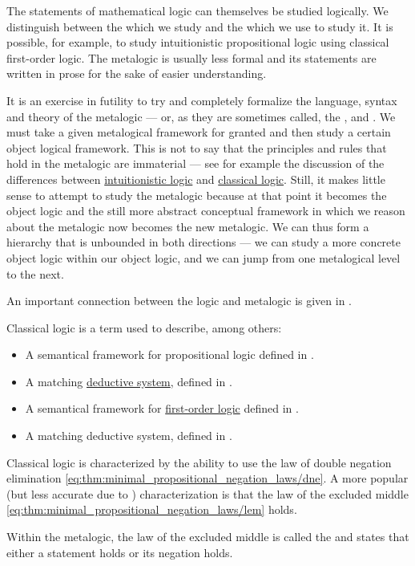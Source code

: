 \begin{remark}\label{rem:metalogic}
  The statements of mathematical logic can themselves be studied logically. We distinguish between the  which we study and the  which we use to study it. It is possible, for example, to study intuitionistic propositional logic using classical first-order logic. The metalogic is usually less formal and its statements are written in prose for the sake of easier understanding.

  It is an exercise in futility to try and completely formalize the language, syntax and theory of the metalogic --- or, as they are sometimes called, the ,  and . We must take a given metalogical framework for granted and then study a certain object logical framework. This is not to say that the principles and rules that hold in the metalogic are immaterial --- see for example the discussion of the differences between \hyperref[rem:intuitionistic_logic]{intuitionistic logic} and \hyperref[rem:classical_logic]{classical logic}. Still, it makes little sense to attempt to study the metalogic because at that point it becomes the object logic and the still more abstract conceptual framework in which we reason about the metalogic now becomes the new metalogic. We can thus form a hierarchy that is unbounded in both directions --- we can study a more concrete object logic within our object logic, and we can jump from one metalogical level to the next.

  An important connection between the logic and metalogic is given in .
\end{remark}

\begin{remark}\label{rem:classical_logic}
  Classical logic is a term used to describe, among others:
  \begin{itemize}
    \item A semantical framework for propositional logic defined in .
    \item A matching \hyperref[def:deductive_system]{deductive system}, defined in .
    \item A semantical framework for \hyperref[subsec:first_order_logic]{first-order logic} defined in .
    \item A matching deductive system, defined in .
  \end{itemize}

  Classical logic is characterized by the ability to use the law of double negation elimination \eqref{eq:thm:minimal_propositional_negation_laws/dne}. A more popular (but less accurate due to ) characterization is that the law of the excluded middle \eqref{eq:thm:minimal_propositional_negation_laws/lem} holds.

  Within the metalogic, the law of the excluded middle is called the  and states that either a statement holds or its negation holds.
\end{remark}

